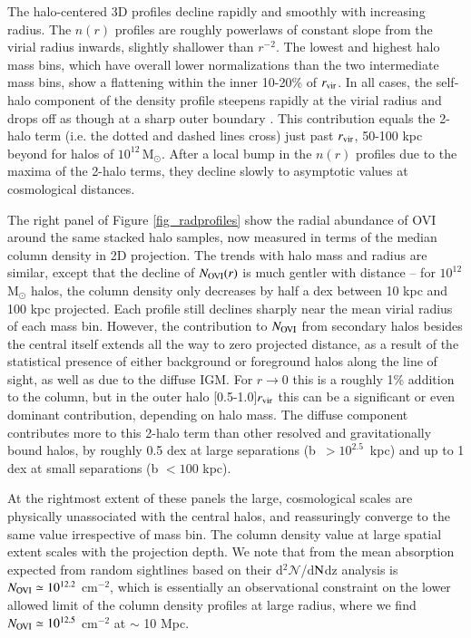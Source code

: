 \documentclass[useAMS,usenatbib]{mnras}
\newcommand{\msun}{\,M$_{\odot}$\xspace}
\newcommand{\ovi}{OVI\xspace}
\begin{document}
The halo-centered 3D profiles decline rapidly and smoothly with increasing radius. The $n(r)$ profiles are roughly powerlaws of constant slope from the virial radius inwards, slightly shallower than $r^{-2}$. The lowest and highest halo mass bins, which have overall lower normalizations than the two intermediate mass bins, show a flattening within the inner 10-20\% of $r_{\rm vir}$. In all cases, the self-halo component of the density profile steepens rapidly at the virial radius and drops off as though at a sharp outer boundary \citep[although see][]{nelson16,vog18a}. This contribution equals the 2-halo term (i.e. the dotted and dashed lines cross) just past $r_{\rm vir}$, 50-100 kpc beyond for halos of $10^{12}$\msun. After a local bump in the $n(r)$ profiles due to the maxima of the 2-halo terms, they decline slowly to asymptotic values at cosmological distances.

The right panel of Figure \ref{fig_radprofiles} show the radial abundance of \ovi around the same stacked halo samples, now measured in terms of the median column density in 2D projection. The trends with halo mass and radius are similar, except that the decline of $N_{\rm OVI}(r)$ is much gentler with distance -- for $10^{12}$\msun halos, the column density only decreases by half a dex between 10 kpc and 100 kpc projected. Each profile still declines sharply near the mean virial radius of each mass bin. However, the contribution to $N_{\rm OVI}$ from secondary halos besides the central itself extends all the way to zero projected distance, as a result of the statistical presence of either background or foreground halos along the line of sight, as well as due to the diffuse IGM. For $r \rightarrow 0$ this is a roughly 1\% addition to the column, but in the outer halo [0.5-1.0]$r_{\rm vir}$ this can be a significant or even dominant contribution, depending on halo mass. The diffuse component contributes more to this 2-halo term than other resolved and gravitationally bound halos, by roughly 0.5 dex at large separations (\mbox{b $> 10^{2.5}$ kpc}) and up to 1 dex at small separations (b $< 100$ kpc).

At the rightmost extent of these panels the large, cosmological scales are physically unassociated with the central halos, and reassuringly converge to the same value irrespective of mass bin. The column density value at large spatial extent scales with the projection depth. We note that from \protect\cite{danforth16} the mean absorption expected from random sightlines based on their d$^2\mathcal{N}$/d$\rm{N}$dz analysis is $N_{\rm OVI} \simeq 10^{12.2}$ cm$^{-2}$, which is essentially an observational constraint on the lower allowed limit of the column density profiles at large radius, where we find $N_{\rm OVI} \simeq 10^{12.5}$ cm$^{-2}$ at $\sim$ 10 Mpc.
\end{document}
